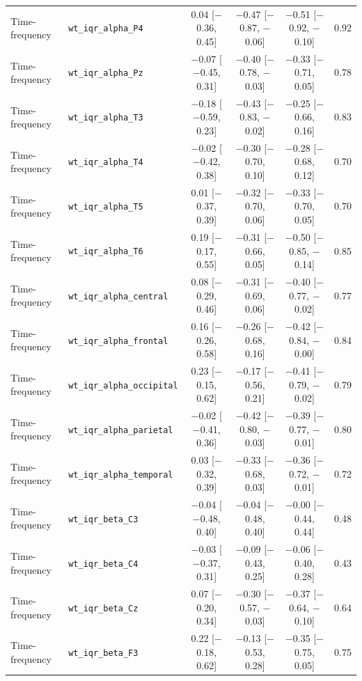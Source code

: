 {\begin{longtable}{llcccc}
Time-frequency & \texttt{wt\_iqr\_alpha\_P4} & 0.04 [$-$0.36, 0.45] & $-$0.47 [$-$0.87, $-$0.06] & $-$0.51 [$-$0.92, $-$0.10] & 0.92 \\
Time-frequency & \texttt{wt\_iqr\_alpha\_Pz} & $-$0.07 [$-$0.45, 0.31] & $-$0.40 [$-$0.78, $-$0.03] & $-$0.33 [$-$0.71, 0.05] & 0.78 \\
Time-frequency & \texttt{wt\_iqr\_alpha\_T3} & $-$0.18 [$-$0.59, 0.23] & $-$0.43 [$-$0.83, $-$0.02] & $-$0.25 [$-$0.66, 0.16] & 0.83 \\
Time-frequency & \texttt{wt\_iqr\_alpha\_T4} & $-$0.02 [$-$0.42, 0.38] & $-$0.30 [$-$0.70, 0.10] & $-$0.28 [$-$0.68, 0.12] & 0.70 \\
Time-frequency & \texttt{wt\_iqr\_alpha\_T5} & 0.01 [$-$0.37, 0.39] & $-$0.32 [$-$0.70, 0.06] & $-$0.33 [$-$0.70, 0.05] & 0.70 \\
Time-frequency & \texttt{wt\_iqr\_alpha\_T6} & 0.19 [$-$0.17, 0.55] & $-$0.31 [$-$0.66, 0.05] & $-$0.50 [$-$0.85, $-$0.14] & 0.85 \\
Time-frequency & \texttt{wt\_iqr\_alpha\_central} & 0.08 [$-$0.29, 0.46] & $-$0.31 [$-$0.69, 0.06] & $-$0.40 [$-$0.77, $-$0.02] & 0.77 \\
Time-frequency & \texttt{wt\_iqr\_alpha\_frontal} & 0.16 [$-$0.26, 0.58] & $-$0.26 [$-$0.68, 0.16] & $-$0.42 [$-$0.84, $-$0.00] & 0.84 \\
Time-frequency & \texttt{wt\_iqr\_alpha\_occipital} & 0.23 [$-$0.15, 0.62] & $-$0.17 [$-$0.56, 0.21] & $-$0.41 [$-$0.79, $-$0.02] & 0.79 \\
Time-frequency & \texttt{wt\_iqr\_alpha\_parietal} & $-$0.02 [$-$0.41, 0.36] & $-$0.42 [$-$0.80, $-$0.03] & $-$0.39 [$-$0.77, $-$0.01] & 0.80 \\
Time-frequency & \texttt{wt\_iqr\_alpha\_temporal} & 0.03 [$-$0.32, 0.39] & $-$0.33 [$-$0.68, 0.03] & $-$0.36 [$-$0.72, $-$0.01] & 0.72 \\
Time-frequency & \texttt{wt\_iqr\_beta\_C3} & $-$0.04 [$-$0.48, 0.40] & $-$0.04 [$-$0.48, 0.40] & $-$0.00 [$-$0.44, 0.44] & 0.48 \\
Time-frequency & \texttt{wt\_iqr\_beta\_C4} & $-$0.03 [$-$0.37, 0.31] & $-$0.09 [$-$0.43, 0.25] & $-$0.06 [$-$0.40, 0.28] & 0.43 \\
Time-frequency & \texttt{wt\_iqr\_beta\_Cz} & 0.07 [$-$0.20, 0.34] & $-$0.30 [$-$0.57, $-$0.03] & $-$0.37 [$-$0.64, $-$0.10] & 0.64 \\
Time-frequency & \texttt{wt\_iqr\_beta\_F3} & 0.22 [$-$0.18, 0.62] & $-$0.13 [$-$0.53, 0.28] & $-$0.35 [$-$0.75, 0.05] & 0.75 \\

\end{longtable}}
